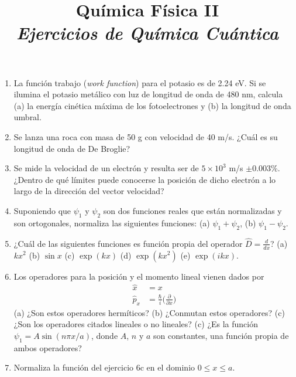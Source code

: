 \documentclass[a4paper, 11pt]{article}
\title{\huge\textsf{\textbf{Qu\'imica Física II}\\
\Large \textit{Ejercicios de Química Cuántica}}}
\date{}
\begin{document}
\maketitle
\large
\begin{enumerate}
    \item La función trabajo (\textit{work
    function}) para el potasio es de 2.24
    eV. Si se ilumina el potasio metálico
    con luz de longitud de onda de 480 nm,
    calcula (a) la energía cinética máxima
    de los fotoelectrones y (b) la longitud
    de onda umbral.
    
    \item Se lanza una roca con masa de 
    50 g con velocidad de 40 m/s. ¿Cuál es
    su longitud de onda de De Broglie?
    
    \item Se mide la velocidad de un
    electrón y resulta ser de $5\times10^3$
    m/s $\pm$0.003\%. ¿Dentro de qué
    límites puede conocerse la posición de
    dicho electrón a lo largo de la
    dirección del vector velocidad?
    
    \item Suponiendo que $\psi_1$ y
    $\psi_2$ son dos funciones reales que 
    están normalizadas y son ortogonales, 
    normaliza las siguientes funciones:
    (a) $\psi_1+\psi_2$, (b) 
    $\psi_1-\psi_2$.
    
    \item ¿Cuál de las siguientes funciones
    es función propia del operador
    $\hat{D}=\frac{d}{dx}$? (a) $kx^2$
    (b) $\sin x$ (c) $\exp (kx)$ 
    (d) $\exp(kx^2)$ (e) $\exp(ikx)$.
    
    \item Los operadores para la posición y
    el momento lineal vienen dados por 
    \begin{equation}
        \begin{array}{cc}
             \hat{x}& =x  \\
            \hat{p}_x& =\frac{\hbar}{i}\big(\frac{\partial}{\partial x}\big)
        \end{array}
    \end{equation}
    (a) ¿Son estos operadores hermíticos?
    (b) ¿Conmutan estos operadores?
    (c) ¿Son los operadores citados lineales
    o no lineales?
    (c) ¿Es la función $\psi_1=A\sin (n\pi
    x/a)$, donde $A$, $n$ y $a$ son
    constantes, una función propia de ambos
    operadores?
   
   \item Normaliza la función del ejercicio
   6c en el dominio $0\leq x\leq a$.
   

\end{enumerate}
\end{document}
